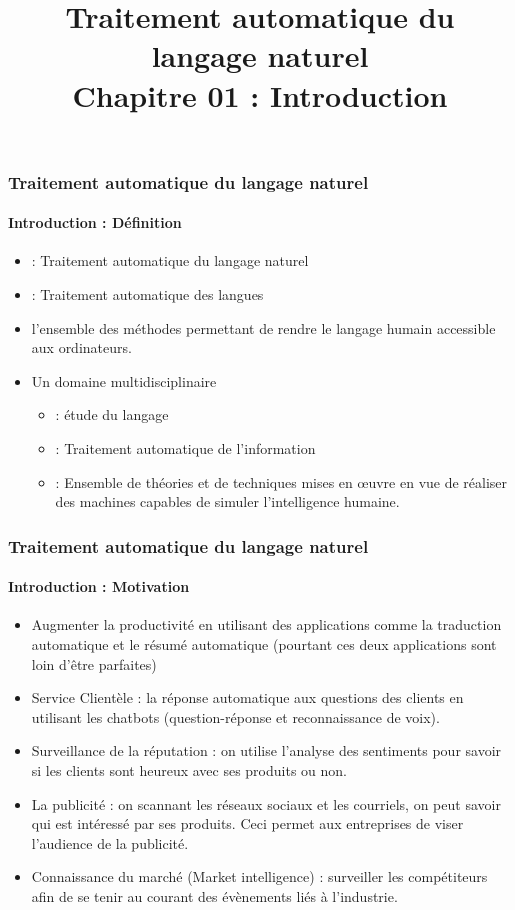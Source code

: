 \documentclass[xcolor=table]{beamer}
\title[TALN : 01- Introduction]%
{Traitement automatique du langage naturel\\Chapitre 01 : Introduction}
\begin{document}
	
\begin{frame}
\frametitle{Traitement automatique du langage naturel}
\framesubtitle{Introduction : Définition}

\begin{itemize}
	\item {} : Traitement automatique du langage naturel
	\item {} : Traitement automatique des langues
	\item l'ensemble des méthodes permettant de rendre le langage humain accessible aux ordinateurs.
\end{itemize}
\begin{minipage}{0.78\textwidth}
\begin{itemize}
	\item Un domaine multidisciplinaire
	\begin{itemize}
		\item {} : étude du langage
		\item {} : Traitement automatique de l'information
		\item {} : Ensemble de théories et de techniques mises en œuvre en vue de réaliser des machines capables de simuler l'intelligence humaine.
	\end{itemize}
\end{itemize}
\end{minipage}
\begin{minipage}{0.20\textwidth}
\end{minipage}
\end{frame}

\begin{frame}
\frametitle{Traitement automatique du langage naturel}
\framesubtitle{Introduction : Motivation}

\begin{itemize}
	\item Augmenter la productivité en utilisant des applications comme la traduction automatique et le résumé automatique (pourtant ces deux applications sont loin d'être parfaites)
	
	\item Service Clientèle : la réponse automatique aux questions des clients en utilisant les chatbots (question-réponse et reconnaissance de voix). 
	
	\item Surveillance de la réputation : on utilise l'analyse des sentiments pour savoir si les clients sont heureux avec ses produits ou non. 
	
	\item La publicité : on scannant les réseaux sociaux et les courriels, on peut savoir qui est intéressé par ses produits. Ceci permet aux entreprises de viser l'audience de la publicité. 
	
	\item Connaissance du marché (Market intelligence) : surveiller les compétiteurs afin de se tenir au courant des évènements liés à l'industrie.
\end{itemize}

\end{frame}
\end{document}
